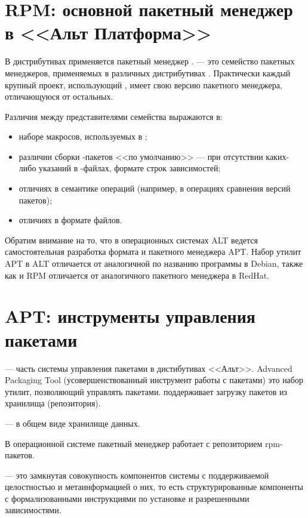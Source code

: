 \section{RPM: основной пакетный менеджер в <<Альт Платформа>>}
В дистрибутивах  применяется пакетный менеджер .  ---
это семейство пакетных менеджеров, применяемых в различных дистрибутивах .
Практически каждый крупный проект, использующий , имеет свою версию пакетного менеджера,
отличающуюся от остальных.

Различия между представителями семейства  выражаются в:

\begin{itemize}
	\item наборе макросов, используемых в ;
	\item различии сборки -пакетов <<по умолчанию>> --- при отсутствии каких-либо
	указаний в -файлах, формате строк зависимостей;
	\item отличиях в семантике операций (например, в операциях сравнения версий пакетов);
	\item отличиях в формате файлов.
\end{itemize}

Обратим внимание на то, что в операционных системах ALT ведется самостоятельная
разработка формата  и пакетного менеджера APT. Набор утилит APT в ALT отличается
от аналогичной по названию программы в Debian, также как и RPM отличается от
аналогичного пакетного менеджера в RedHat.

\section{APT: инструменты управления пакетами}
 --- часть системы управления пакетами в дистибутивах <<Альт>>. Advanced Packaging Tool
(усовершенствованный инструмент работы с пакетами) это набор утилит, позволяющий управлять пакетами.
  поддерживает загрузку пакетов из хранилища (репозитория).

 ---  в общем виде хранилище данных.

В операционной системе  пакетный менеджер работает с репозиторием rpm-пакетов.

 --- это замкнутая совокупность компонентов системы с
поддерживаемой целостностью и метаинформацией о них, то есть структурированные
компоненты с формализованными инструкциями по установке и разрешенными зависимостями.

